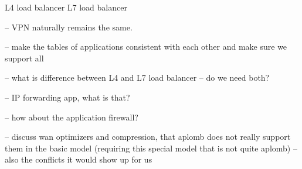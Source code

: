 L4 load balancer
L7 load balancer

-- VPN naturally remains the same. 

-- make the tables of applications consistent with each other and make sure we support all 

-- what is difference between L4 and L7 load balancer -- do we need both?

-- IP forwarding app, what is that?

-- how about the application firewall?

-- discuss wan optimizers and compression, that aplomb does not really support them in the basic model (requiring this special model that is not quite aplomb) -- also the conflicts it would show up for us
